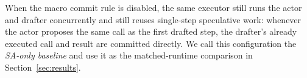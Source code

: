 
When the macro commit rule is disabled, the same executor still runs the actor and drafter concurrently and still reuses single-step speculative work: whenever the actor proposes the same call as the first drafted step, the drafter's already executed call and result are committed directly. 
We call this configuration the \emph{SA-only baseline} and use it as the matched-runtime comparison in Section~\ref{sec:results}.



